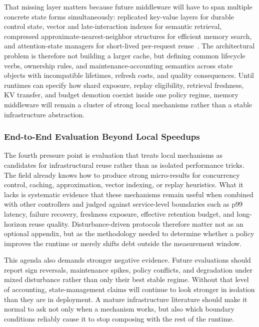 \documentclass[acmsmall,screen,review]{acmart}
\begin{document}
That missing layer matters because future middleware will have to span multiple concrete state forms simultaneously: replicated key-value layers for durable control state, vector and late-interaction indexes for semantic retrieval, compressed approximate-nearest-neighbor structures for efficient memory search, and attention-state managers for short-lived per-request reuse~\cite{chang2008bigtable,decandia2007dynamo,karpukhin2020dpr,khattab2020colbert,jegou2011pq,malkov2020hnsw,kwon2023pagedattention,dao2024flashattention2}. The architectural problem is therefore not building a larger cache, but defining common lifecycle verbs, ownership rules, and maintenance-accounting semantics across state objects with incompatible lifetimes, refresh costs, and quality consequences. Until runtimes can specify how shard exposure, replay eligibility, retrieval freshness, KV transfer, and budget demotion coexist inside one policy regime, memory middleware will remain a cluster of strong local mechanisms rather than a stable infrastructure abstraction.

\subsubsection{End-to-End Evaluation Beyond Local Speedups}

The fourth pressure point is evaluation that treats local mechanisms as candidates for infrastructural reuse rather than as isolated performance tricks. The field already knows how to produce strong micro-results for concurrency control, caching, approximation, vector indexing, or replay heuristics. What it lacks is systematic evidence that these mechanisms remain useful when combined with other controllers and judged against service-level boundaries such as p99 latency, failure recovery, freshness exposure, effective retention budget, and long-horizon reuse quality. Disturbance-driven protocols therefore matter not as an optional appendix, but as the methodology needed to determine whether a policy improves the runtime or merely shifts debt outside the measurement window.

This agenda also demands stronger negative evidence. Future evaluations should report sign reversals, maintenance spikes, policy conflicts, and degradation under mixed disturbance rather than only their best stable regime. Without that level of accounting, state-management claims will continue to look stronger in isolation than they are in deployment. A mature infrastructure literature should make it normal to ask not only when a mechanism works, but also which boundary conditions reliably cause it to stop composing with the rest of the runtime.
\end{document}
